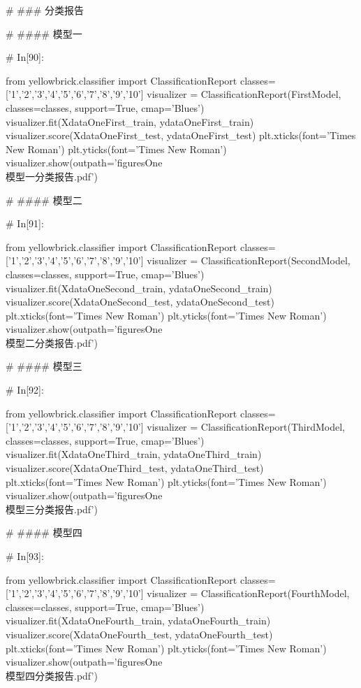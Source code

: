 \documentclass{MathorCupmodeling}
\begin{document}
\begin{python}
# ### 分类报告

# #### 模型一

# In[90]:


from yellowbrick.classifier import ClassificationReport
classes=['1','2','3','4','5','6','7','8','9','10']
visualizer = ClassificationReport(FirstModel, classes=classes, support=True, cmap='Blues')
visualizer.fit(XdataOneFirst_train, ydataOneFirst_train)
visualizer.score(XdataOneFirst_test, ydataOneFirst_test)
plt.xticks(font='Times New Roman')
plt.yticks(font='Times New Roman')
visualizer.show(outpath='figuresOne\\[附件1]模型一分类报告.pdf')


# #### 模型二

# In[91]:


from yellowbrick.classifier import ClassificationReport
classes=['1','2','3','4','5','6','7','8','9','10']
visualizer = ClassificationReport(SecondModel, classes=classes, support=True, cmap='Blues')
visualizer.fit(XdataOneSecond_train, ydataOneSecond_train)
visualizer.score(XdataOneSecond_test, ydataOneSecond_test)
plt.xticks(font='Times New Roman')
plt.yticks(font='Times New Roman')
visualizer.show(outpath='figuresOne\\[附件1]模型二分类报告.pdf')


# #### 模型三

# In[92]:


from yellowbrick.classifier import ClassificationReport
classes=['1','2','3','4','5','6','7','8','9','10']
visualizer = ClassificationReport(ThirdModel, classes=classes, support=True, cmap='Blues')
visualizer.fit(XdataOneThird_train, ydataOneThird_train)
visualizer.score(XdataOneThird_test, ydataOneThird_test)
plt.xticks(font='Times New Roman')
plt.yticks(font='Times New Roman')
visualizer.show(outpath='figuresOne\\[附件1]模型三分类报告.pdf')


# #### 模型四

# In[93]:


from yellowbrick.classifier import ClassificationReport
classes=['1','2','3','4','5','6','7','8','9','10']
visualizer = ClassificationReport(FourthModel, classes=classes, support=True, cmap='Blues')
visualizer.fit(XdataOneFourth_train, ydataOneFourth_train)
visualizer.score(XdataOneFourth_test, ydataOneFourth_test)
plt.xticks(font='Times New Roman')
plt.yticks(font='Times New Roman')
visualizer.show(outpath='figuresOne\\[附件1]模型四分类报告.pdf')



\end{python}
\end{document}
